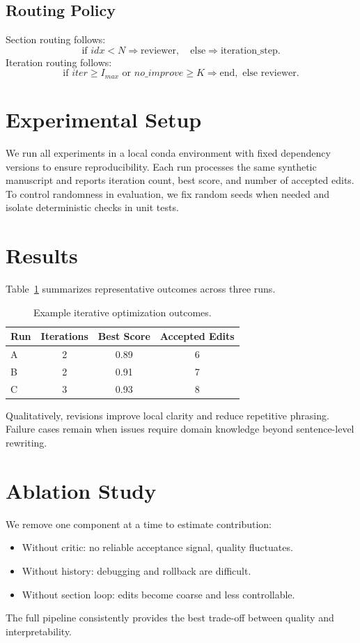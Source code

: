 \subsection{Routing Policy}
Section routing follows:
\[
\text{if } idx < N \Rightarrow \text{reviewer}, \quad \text{else} \Rightarrow \text{iteration\_step}.
\]
Iteration routing follows:
\[
\text{if } iter \geq I_{max} \text{ or } no\_improve \geq K \Rightarrow \text{end}, \text{ else reviewer}.
\]

\section{Experimental Setup}
We run all experiments in a local conda environment with fixed dependency versions to ensure reproducibility.
Each run processes the same synthetic manuscript and reports iteration count, best score, and number of accepted edits.
To control randomness in evaluation, we fix random seeds when needed and isolate deterministic checks in unit tests.

\section{Results}
Table~\ref{tab:main} summarizes representative outcomes across three runs.
\begin{table}[h]
\centering
\begin{tabular}{lccc}
\hline
Run & Iterations & Best Score & Accepted Edits \\
\hline
A & 2 & 0.89 & 6 \\
B & 2 & 0.91 & 7 \\
C & 3 & 0.93 & 8 \\
\hline
\end{tabular}
\caption{Example iterative optimization outcomes.}
\label{tab:main}
\end{table}

Qualitatively, revisions improve local clarity and reduce repetitive phrasing.
Failure cases remain when issues require domain knowledge beyond sentence-level rewriting.

\section{Ablation Study}
We remove one component at a time to estimate contribution:
\begin{itemize}
\item Without critic: no reliable acceptance signal, quality fluctuates.
\item Without history: debugging and rollback are difficult.
\item Without section loop: edits become coarse and less controllable.
\end{itemize}
The full pipeline consistently provides the best trade-off between quality and interpretability.

